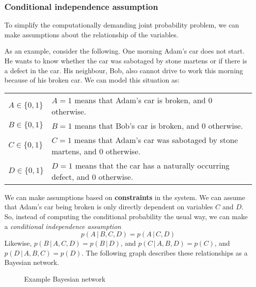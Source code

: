 \documentclass{article}
\begin{document}
\subsubsection{Conditional independence assumption}
To simplify the computationally demanding joint probability problem, we can make assumptions about the relationship of the variables. 

As an example, consider the following. One morning Adam's car does not start. He wants to know whether the car was sabotaged by stone martens or if there is a defect in the car. His neighbour, Bob, also cannot drive to work this morning because of his broken car. We can model this situation as:
\begin{table}[H]
    \centering
    \begin{tabular}{ll}
        $A \in \{0, 1\}$ & $A = 1$ means that Adam's car is broken, and 0 otherwise. \\
        $B \in \{0, 1\}$ & $B = 1$ means that Bob's car is broken, and 0 otherwise. \\
        $C \in \{0, 1\}$ & $C = 1$ means that Adam's car was sabotaged by stone martens, and 0 otherwise. \\
        $D \in \{0, 1\}$ & $D = 1$ means that the car has a naturally occurring defect, and 0 otherwise. 
    \end{tabular}    
\end{table}

\noindent We can make assumptions based on \textbf{constraints} in the system. We can assume that Adam's car being broken is only directly dependent on variables $C$ and $D$. So, instead of computing the conditional probability the usual way, we can make a \textit{conditional independence assumption}
$$
    p(A\,|\, B, C, D) = p(A\,|\, C, D)
$$
Likewise, $p(B \,|\, A, C, D) = p(B \,|\, D)$, and $p(C \,|\, A, B, D) = p(C)$, and $p(D \,|\, A, B, C) = p(D)$. The following graph describes these relationships as a Bayesian network.

\begin{figure}[H]
    \centering
    \caption{Example Bayesian network}
    \label{fig:my_label}
\end{figure}
\end{document}
